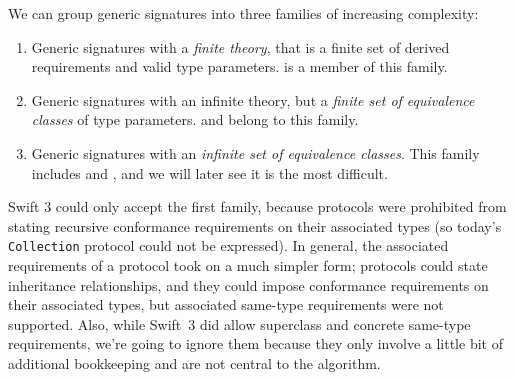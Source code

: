 \documentclass[../generics]{subfiles}
\begin{document}
We can group generic signatures into three families of increasing complexity:
\begin{enumerate}
\item Generic signatures with a \emph{finite theory}, that is a finite set of derived requirements and valid type parameters.  is a member of this family.
\item Generic signatures with an infinite theory, but a \emph{finite set of equivalence classes} of type parameters.  and  belong to this family.
\item Generic signatures with an \emph{infinite set of equivalence classes}. This family includes  and , and we will later see it is the most difficult.
\end{enumerate}
Swift 3 could only accept the first family, because protocols were prohibited from stating recursive conformance requirements on their associated types (so today's \texttt{Collection} protocol could not be expressed). In general, the associated requirements of a protocol took on a much simpler form; protocols could state inheritance relationships, and they could impose conformance requirements on their associated types, but associated same-type requirements were not supported. Also, while Swift~3 did allow superclass and concrete same-type requirements, we're going to ignore them because they only involve a little bit of additional bookkeeping and are not central to the algorithm.

\newcommand{\PAForward}{\texttt{FORWARD}}
\newcommand{\PAType}{\texttt{TYPE}}
\newcommand{\PAConforms}{\texttt{PROTO}}
\newcommand{\PAMembers}{\texttt{MEMBERS}}
\end{document}
